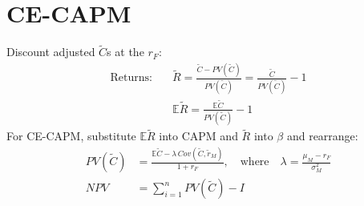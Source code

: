 \documentclass{article}
\newcommand{\E}{\mathbb{E}}
\newcommand{\sumn}{\sum_{i=1}^{n}}
\newcommand{\CF}{\tilde{C}}
\begin{document}
\section{CE-CAPM}
Discount adjusted $\CF$s at the $r_F$:
\begin{align*}
    \text{Returns}: \quad&\tilde{R} =\frac{\CF -PV(\CF)}{PV(\CF)}=\frac{\CF}{PV(\CF)}-1\\
    & \E\tilde{R} =\frac{\E \CF}{PV(\CF)}-1
\end{align*}
For CE-CAPM, substitute $\E\tilde{R}$ into CAPM and $\tilde{R}$ into $\beta$ and rearrange:
\begin{align*}
    PV(\CF)&=\frac{\E\CF -\lambda \,Cov(\CF,\tilde{r}_M)}{1+r_F}, \quad \text{where}\quad \lambda = \frac{\mu_M-r_F}{\sigma_M^2}\\
    NPV&=\sumn PV(\CF)-I
\end{align*}
\end{document}
